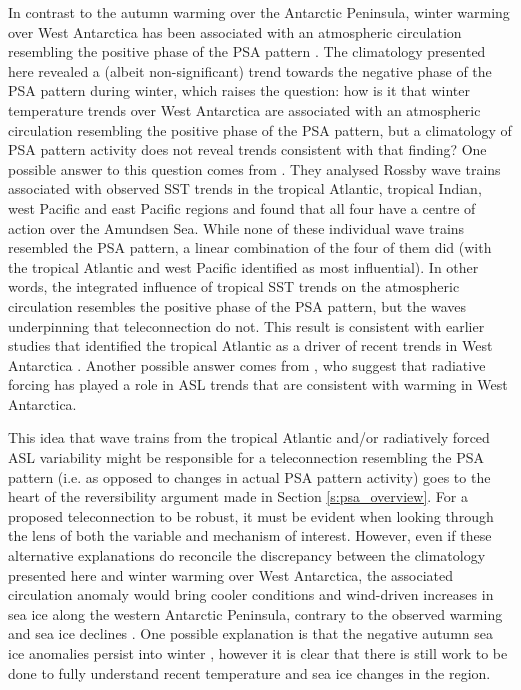 In contrast to the autumn warming over the Antarctic Peninsula, winter warming over West Antarctica has been associated with an atmospheric circulation resembling the positive phase of the PSA pattern \citep{Ding2011}. The climatology presented here revealed a (albeit non-significant) trend towards the negative phase of the PSA pattern during winter, which raises the question: how is it that winter temperature trends over West Antarctica are associated with an atmospheric circulation resembling the positive phase of the PSA pattern, but a climatology of PSA pattern activity does not reveal trends consistent with that finding? One possible answer to this question comes from \citet{Li2015a}. They analysed Rossby wave trains associated with observed SST trends in the tropical Atlantic, tropical Indian, west Pacific and east Pacific regions and found that all four have a centre of action over the Amundsen Sea. While none of these individual wave trains resembled the PSA pattern, a linear combination of the four of them did (with the tropical Atlantic and west Pacific identified as most influential). In other words, the integrated influence of tropical SST trends on the atmospheric circulation resembles the positive phase of the PSA pattern, but the waves underpinning that teleconnection do not. This result is consistent with earlier studies that identified the tropical Atlantic as a driver of recent trends in West Antarctica \citep{Li2014,Simpkins2014}. Another possible answer comes from \citet{Fogt2015}, who suggest that radiative forcing has played a role in ASL trends that are consistent with warming in West Antarctica. 

This idea that wave trains from the tropical Atlantic and/or radiatively forced ASL variability might be responsible for a teleconnection resembling the PSA pattern (i.e. as opposed to changes in actual PSA pattern activity) goes to the heart of the reversibility argument made in Section \ref{s:psa_overview}. For a proposed teleconnection to be robust, it must be evident when looking through the lens of both the variable and mechanism of interest. However, even if these alternative explanations do reconcile the discrepancy between the climatology presented here and winter warming over West Antarctica, the associated circulation anomaly would bring cooler conditions and wind-driven increases in sea ice along the western Antarctic Peninsula, contrary to the observed warming and sea ice declines \citep{Clem2015}. One possible explanation is that the negative autumn sea ice anomalies persist into winter \citep{Ding2013}, however it is clear that there is still work to be done to fully understand recent temperature and sea ice changes in the region.

